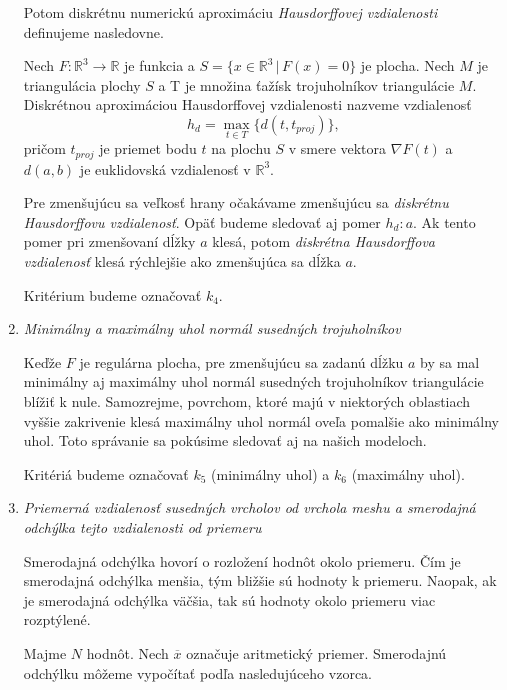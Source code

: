 \begin{enumerate}
{    Potom diskrétnu numerickú aproximáciu \textit{Hausdorffovej vzdialenosti} definujeme nasledovne.
    \begin{definition}
        Nech $F:\mathbb{R}^3 \to \mathbb{R}$ je funkcia a $S = \{x \in \mathbb{R}^3 \, | \, F(x)=0 \}$ 
        je plocha. Nech $M$ je triangulácia plochy $S$
        a T je množina ťažísk trojuholníkov triangulácie $M$.
        Diskrétnou aproximáciou Hausdorffovej vzdialenosti nazveme vzdialenosť
        \begin{equation}
            h_d = \max_{t \in T} \big \{ d(t, t_{proj})\big \},
        \end{equation}
        pričom $t_{proj}$ je priemet bodu $t$ na plochu $S$ v smere vektora $\nabla F(t)$ a
        $d(a, b)$ je euklidovská vzdialenosť v $\mathbb{R}^3$.
    \end{definition}

    Pre zmenšujúcu sa veľkosť hrany očakávame zmenšujúcu sa \textit{diskrétnu Hausdorffovu vzdialenosť}.
    Opäť budeme sledovať aj pomer $h_d : a$. Ak tento pomer pri zmenšovaní dĺžky $a$ klesá, potom 
    \textit{diskrétna Hausdorffova vzdialenosť} klesá rýchlejšie ako zmenšujúca sa dĺžka $a$.

    Kritérium budeme označovať $k_4$.
}
\item{
    \textit{Minimálny a maximálny uhol normál susedných trojuholníkov}

    Keďže $F$ je regulárna plocha, pre zmenšujúcu sa zadanú dĺžku $a$ by sa mal minimálny aj maximálny 
    uhol normál susedných trojuholníkov triangulácie blížiť k nule. Samozrejme, povrchom, ktoré majú 
    v niektorých oblastiach vyššie zakrivenie klesá maximálny uhol normál oveľa pomalšie ako minimálny
    uhol. Toto správanie sa pokúsime sledovať aj na našich modeloch.

    Kritériá budeme označovať $k_5$ (minimálny uhol) a $k_6$ (maximálny uhol).
}
\item{
    \textit{Priemerná vzdialenosť susedných vrcholov od vrchola meshu a smerodajná odchýlka tejto vzdialenosti od priemeru}

    Smerodajná odchýlka hovorí o rozložení hodnôt okolo priemeru. Čím je smerodajná odchýlka menšia, 
    tým bližšie sú hodnoty k priemeru. Naopak, ak je smerodajná odchýlka väčšia, tak sú hodnoty okolo
    priemeru viac rozptýlené.
    
    Majme $N$ hodnôt. Nech $\overline{x}$ označuje aritmetický priemer. 
    Smerodajnú odchýlku môžeme vypočítať podľa nasledujúceho vzorca.

}
\end{enumerate}
